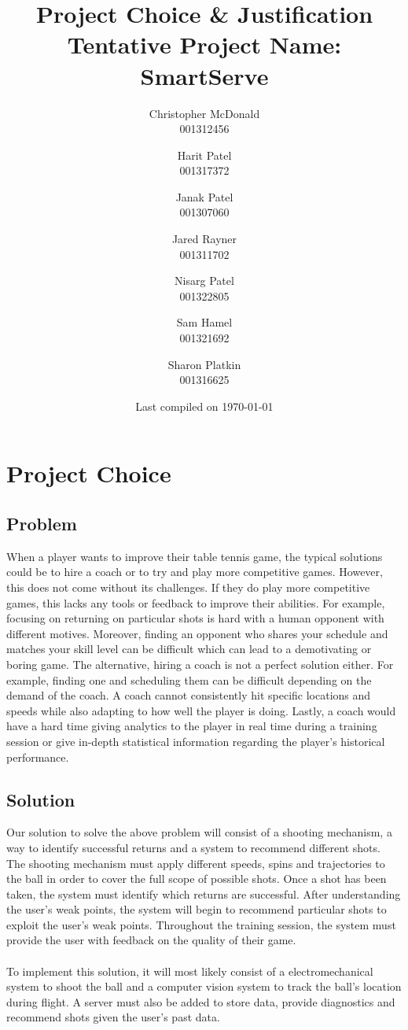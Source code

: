 \documentclass[11pt, oneside]{article}
\title{Project Choice \& Justification \\ Tentative Project Name: SmartServe}
\author{
Christopher McDonald \\ 001312456 \\ \and
Harit Patel \\ 001317372 \\ \and
Janak Patel \\ 001307060 \\ \and
Jared Rayner \\ 001311702 \\ \and
Nisarg Patel \\ 001322805 \\ \and
Sam Hamel \\ 001321692 \\ \and
Sharon Platkin \\ 001316625 \\
}
\date{Last compiled on \today}
\begin{document}
\maketitle
\section*{Project Choice}
\subsection*{Problem}
When a player wants to improve their table tennis game, the typical solutions could be to hire a coach or to try and play more competitive games. However, this does not come without its challenges. If they do play more competitive games, this lacks any tools or feedback to improve their abilities. For example, focusing on returning on particular shots is hard with a human opponent with different motives. Moreover, finding an opponent who shares your schedule and matches your skill level can be difficult which can lead to a demotivating or boring game. The alternative, hiring a coach is not a perfect solution either. For example, finding one and scheduling them can be difficult depending on the demand of the coach. A coach cannot consistently hit specific locations and speeds while also adapting to how well the player is doing. Lastly, a coach would have a hard time giving analytics to the player in real time during a training session or give in-depth statistical information regarding the player's historical performance.
\subsection*{Solution}
Our solution to solve the above problem will consist of a shooting mechanism, a way to identify successful returns and a system to recommend different shots. The shooting mechanism must apply different speeds, spins and trajectories to the ball in order to cover the full scope of possible shots. Once a shot has been taken, the system must identify which returns are successful. After understanding the user's weak points, the system will begin to recommend particular shots to exploit the user's weak points. Throughout the training session, the system must provide the user with feedback on the quality of their game. \\\\
To implement this solution, it will most likely consist of a electromechanical system to shoot the ball and a computer vision system to track the ball's location during flight. A server must also be added to store data, provide diagnostics and recommend shots given the user's past data.
\end{document}
